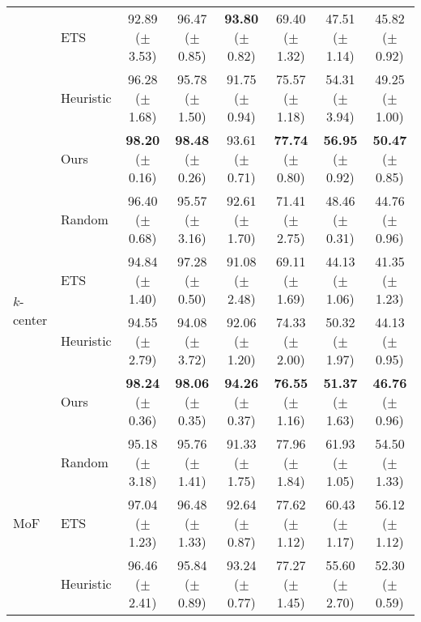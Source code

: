 \begin{table*}[t]
{\begin{tabular}{l l c c c c c c}
     & ETS  & 92.89 {\scriptsize ($\pm$ 3.53)} & 96.47 {\scriptsize ($\pm$ 0.85)} & {\bf 93.80} {\scriptsize ($\pm$ 0.82)} & 69.40 {\scriptsize ($\pm$ 1.32)} & 47.51 {\scriptsize ($\pm$ 1.14)} & 45.82 {\scriptsize ($\pm$ 0.92)} \\
     & Heuristic &  96.28 {\scriptsize ($\pm$ 1.68)} &  95.78 {\scriptsize ($\pm$ 1.50)}  & 91.75 {\scriptsize ($\pm$ 0.94)} & 75.57 {\scriptsize ($\pm$ 1.18)} & 54.31 {\scriptsize ($\pm$  3.94)} & 49.25 {\scriptsize ($\pm$ 1.00)} \\
    & Ours & {\bf 98.20} {\scriptsize ($\pm$ 0.16)} & {\bf 98.48} {\scriptsize ($\pm$ 0.26)} &  93.61 {\scriptsize ($\pm$ 0.71)} & {\bf 77.74} {\scriptsize ($\pm$ 0.80)} & {\bf 56.95} {\scriptsize ($\pm$ 0.92)} & {\bf 50.47} {\scriptsize ($\pm$ 0.85)} \\  
    \midrule 
    \multirow{4}{*}{$k$-center} & Random & 96.40 {\scriptsize ($\pm$ 0.68)} & 95.57 {\scriptsize ($\pm$ 3.16)}  & 92.61 {\scriptsize ($\pm$ 1.70)} & 71.41 {\scriptsize ($\pm$ 2.75)} & 48.46 {\scriptsize ($\pm$ 0.31)} & 44.76 {\scriptsize ($\pm$ 0.96)} \\ 
     & ETS  & 94.84 {\scriptsize ($\pm$ 1.40)} & 97.28 {\scriptsize ($\pm$ 0.50)} & 91.08 {\scriptsize ($\pm$ 2.48)} & 69.11 {\scriptsize ($\pm$ 1.69)} & 44.13 {\scriptsize ($\pm$ 1.06)} & 41.35 {\scriptsize ($\pm$ 1.23)} \\
     & Heuristic & 94.55 {\scriptsize ($\pm$ 2.79)} & 94.08 {\scriptsize ($\pm$ 3.72)} & 92.06 {\scriptsize ($\pm$ 1.20)} & 74.33 {\scriptsize ($\pm$ 2.00)} & 50.32 {\scriptsize ($\pm$ 1.97)} & 44.13 {\scriptsize ($\pm$ 0.95)} \\
     & Ours & {\bf 98.24} {\scriptsize ($\pm$ 0.36)} & {\bf 98.06} {\scriptsize ($\pm$ 0.35)} & {\bf 94.26} {\scriptsize ($\pm$ 0.37)} & {\bf 76.55} {\scriptsize ($\pm$ 1.16)} & {\bf 51.37} {\scriptsize ($\pm$ 1.63)} & {\bf 46.76} {\scriptsize ($\pm$ 0.96)}  \\  
    \midrule 
    \multirow{4}{*}{MoF} & Random & 95.18 {\scriptsize ($\pm$ 3.18)} & 95.76 {\scriptsize ($\pm$ 1.41)}  & 91.33 {\scriptsize ($\pm$ 1.75)} & 77.96 {\scriptsize ($\pm$ 1.84)} & 61.93 {\scriptsize ($\pm$ 1.05)} & 54.50 {\scriptsize ($\pm$ 1.33)} \\ 
     & ETS & 97.04 {\scriptsize ($\pm$ 1.23)} & 96.48 {\scriptsize ($\pm$ 1.33)} & 92.64 {\scriptsize ($\pm$ 0.87)} & 77.62 {\scriptsize ($\pm$ 1.12)} & 60.43 {\scriptsize ($\pm$ 1.17)} & 56.12 {\scriptsize ($\pm$ 1.12)} \\
     & Heuristic & 96.46 {\scriptsize ($\pm$ 2.41)} &  95.84 {\scriptsize ($\pm$ 0.89)} & 93.24 {\scriptsize ($\pm$ 0.77)} & 77.27 {\scriptsize ($\pm$ 1.45)} & 55.60 {\scriptsize ($\pm$ 2.70)} & 52.30 {\scriptsize ($\pm$ 0.59)} \\

\end{tabular}}
\end{table*}
